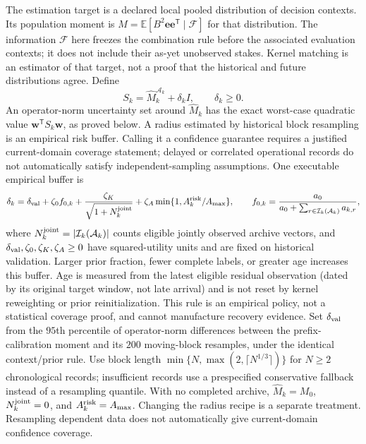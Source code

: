 \documentclass[10pt]{article}
\newcommand{\E}{\mathbb{E}}
\begin{document}
The estimation target is a declared local pooled distribution of decision
contexts. Its population moment is $M=\E[B^2\boldsymbol e\boldsymbol e^{\mathsf T}\mid\mathcal F]$ for that distribution. The information $\mathcal F$ here freezes the
combination rule before the associated evaluation contexts; it does not include
their as-yet unobserved stakes. Kernel matching is an estimator of that
target, not a proof that the historical and future distributions agree. Define
\begin{equation}
 S_k=\widehat M_k^{\mathcal A_k}+\delta_k I,\qquad\delta_k\ge0.
 \label{eq:robust-moment-input}
\end{equation}
An operator-norm uncertainty set around $\widehat M_k$ has the exact worst-case
quadratic value $\boldsymbol w^{\mathsf T}S_k\boldsymbol w$, as proved below.
A radius estimated by historical block resampling is an empirical risk buffer.
Calling it a confidence guarantee requires a justified current-domain coverage
statement; delayed or correlated operational records do not automatically
satisfy independent-sampling assumptions. One executable empirical buffer is
\begin{equation}
 \delta_k=\delta_{\rm val}+\zeta_0 f_{0,k}
 +\frac{\zeta_K}{\sqrt{1+N_k^{\rm joint}}}
 +\zeta_A\min\{1,A_k^{\rm risk}/A_{\max}\},
 \qquad f_{0,k}=\frac{a_0}{a_0+\sum_{r\in\mathcal I_k(\mathcal A_k)} a_{k,r}},
\end{equation}
where $N_k^{\rm joint}=|\mathcal I_k(\mathcal A_k)|$ counts eligible
jointly observed archive vectors, and
$\delta_{\rm val},\zeta_0,\zeta_K,\zeta_A\ge0$ have squared-utility units
and are fixed on historical validation. Larger prior fraction, fewer complete
labels, or greater age increases this buffer. Age is measured from the latest
eligible residual observation (dated by its original target window, not late arrival)
and is not reset by kernel reweighting or prior
reinitialization. This rule is an empirical policy, not a statistical coverage
proof, and cannot manufacture recovery evidence. Set $\delta_{\rm val}$ from
the $95$th percentile of operator-norm differences between the prefix-calibration
moment and its $200$ moving-block resamples, under the identical context/prior
rule. Use block length $\min\{N,\max(2,\lceil N^{1/3}\rceil)\}$ for $N\ge2$
chronological records; insufficient records use a prespecified conservative
fallback instead of a resampling quantile. With no completed archive,
$\widehat M_k=M_0$, $N_k^{\rm joint}=0$, and $A_k^{\rm risk}=A_{\max}$.
Changing the radius recipe is a separate treatment. Resampling dependent data
does not automatically give current-domain confidence coverage.
\end{document}
